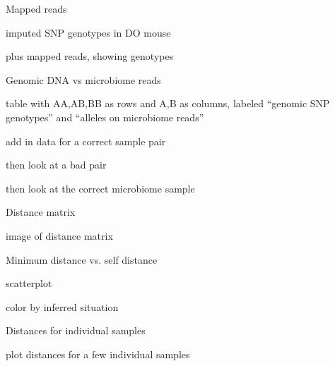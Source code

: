 \documentclass[aspectratio=169,12pt,t]{beamer}
\begin{document}
\begin{frame}[c]{Mapped reads}

\bbi
 \item imputed SNP genotypes in DO mouse
 \item plus mapped reads, showing genotypes
\ei

\note{}

\end{frame}


\begin{frame}[c]{Genomic DNA vs microbiome reads}

\bbi
 \item table with AA,AB,BB as rows and A,B as columns,
    labeled ``genomic SNP genotypes'' and ``alleles on microbiome reads''
 \item add in data for a correct sample pair
 \item then look at a bad pair
 \item then look at the correct microbiome sample
\ei

\note{}

\end{frame}



\begin{frame}[c]{Distance matrix}

\bbi
 \item image of distance matrix
\ei

\note{}

\end{frame}



\begin{frame}[c]{Minimum distance vs. self distance}

\bbi
 \item scatterplot
 \item color by inferred situation
\ei

\note{}

\end{frame}



\begin{frame}[c]{Distances for individual samples}

\bbi
 \item plot distances for a few individual samples
\ei

\note{}

\end{frame}
\end{document}
